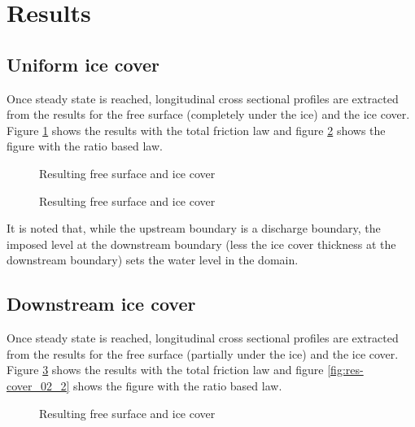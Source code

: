\section{Results}

\subsection{Uniform ice cover}
Once steady state is reached, longitudinal cross sectional profiles are extracted from the results for the free surface (completely under the ice) and the ice cover.
Figure \ref{fig:res-cover_01} shows the results with the total friction law and figure \ref{fig:res-cover_01_2} shows the figure with the ratio based law.

\begin{figure}[H]
    \begin{center}
    \end{center}
    \caption{Resulting free surface and ice cover}
    \label{fig:res-cover_01}
\end{figure}

\begin{figure}[H]
    \begin{center}
    \end{center}
    \caption{Resulting free surface and ice cover}
    \label{fig:res-cover_01_2}
\end{figure}

It is noted that, while the upstream boundary is a discharge boundary, the imposed level at the downstream boundary (less the ice cover thickness at the downstream boundary) sets the water level in the domain.

\subsection{Downstream ice cover}
Once steady state is reached, longitudinal cross sectional profiles are extracted from the results for the free surface (partially under the ice) and the ice cover.
Figure \ref{fig:res-cover_02} shows the results with the total friction law and figure \ref{fig:res-cover_02_2} shows the figure with the ratio based law.

\begin{figure}[H]
    \begin{center}
    \end{center}
    \caption{Resulting free surface and ice cover}
    \label{fig:res-cover_02}
\end{figure}

